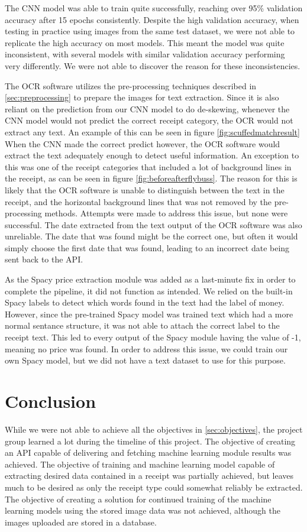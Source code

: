 The CNN model was able to train quite successfully, reaching over 95\% validation accuracy after 15 epochs consistently.
Despite the high validation accuracy, when testing in practice using images from the same test dataset, we were not able to replicate the high accuracy on most models.
This meant the model was quite inconsistent, with several models with similar validation accuracy performing very differently.
We were not able to discover the reason for these inconsistencies.

The OCR software utilizes the pre-processing techniques described in \ref{sec:preprocessing} to prepare the images for text extraction.
Since it is also reliant on the prediction from our CNN model to do de-skewing, whenever the CNN model would not predict the correct receipt category, the OCR would not extract any text.
An example of this can be seen in figure \ref{fig:scuffedmatchresult}
When the CNN made the correct predict however, the OCR software would extract the text adequately enough to detect useful information.
An exception to this was one of the receipt categories that included a lot of background lines in the receipt, as can be seen in figure \ref{fig:beforeafterflybuss}.
The reason for this is likely that the OCR software is unable to distinguish between the text in the receipt, and the horizontal background lines that was not removed by the pre-processing methods.
Attempts were made to address this issue, but none were successful.
The date extracted from the text output of the OCR software was also unreliable.
The date that was found might be the correct one, but often it would simply choose the first date that was found, leading to an incorrect date being sent back to the API.

As the Spacy price extraction module was added as a last-minute fix in order to complete the pipeline, it did not function as intended.
We relied on the built-in Spacy labels to detect which words found in the text had the label of money.
However, since the pre-trained Spacy model was trained text which had a more normal sentance structure, it was not able to attach the correct label to the receipt text.
This led to every output of the Spacy module having the value of -1, meaning no price was found.
In order to address this issue, we could train our own Spacy model, but we did not have a text dataset to use for this purpose.

\section{Conclusion}\label{sec:conclusion}
While we were not able to achieve all the objectives in \ref{sec:objectives}, the project group learned a lot during the timeline of this project.
The objective of creating an API capable of delivering and fetching machine learning module results was achieved.
The objective of training and machine learning model capable of extracting desired data contained in a receipt was partially achieved, but leaves much to be desired as only the receipt type could somewhat reliably be extracted.
The objective of creating a solution for continued training of the machine learning models using the stored image data was not achieved, although the images uploaded are stored in a database.

